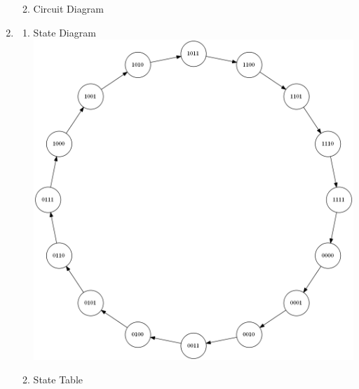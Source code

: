 \documentclass[a4paper]{article}
\begin{document}
\begin{enumerate}
\begin{enumerate}
        \vspace{0.5cm}
        \item Circuit Diagram 
        \vspace{5cm}

      \end{enumerate}
    
      \newpage
      \item 
      \begin{enumerate}

        \item State Diagram \\
        \includegraphics[scale=0.35]{5a}

        \item State Table \\
        

\end{enumerate}
\end{enumerate}
\end{document}
